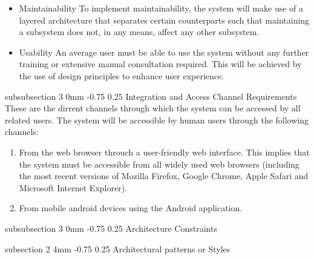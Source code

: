 \documentclass[12pt]{article}
\makeatletter
\renewcommand{\subsection}{\@startsection
   {subsection}%
   {2}%
   {4mm}%
   {-0.75\baselineskip}%
   {0.25\baselineskip}%
   {\rmfamily\normalfont\scshape\normalsize}}%
\renewcommand{\subsubsection}{\@startsection
   {subsubsection}%
   {3}%
   {0mm}%
   {-0.75\baselineskip}%
   {0.25\baselineskip}%
   {\rmfamily\normalfont\slshape\normalsize}}%
\makeatother
\begin{document}
\begin{itemize}
                							\item Maintainability
                									To implement maintainability, the system will make use of a layered architecture that separates certain counterparts such that maintaining a subsystem does not, in any means, affect any other subsystem.
		              								
                							\item Usability
                									An average user must be able to use the system without any further training or extensive manual consultation required. This will be achieved by the use of design principles to enhance user experience.
		               								
                							
                					\end{itemize} 
                			 
                			\subsubsection{Integration and Access Channel Requirements}
                					These are the dirrent channels through which the system can be accessed by all related users.
	                				The system will be accessible by human users through the following channels:
	                				
			                    	\begin{enumerate}
					                    	\item From the web browser throuch a user-friendly web interface. This implies that the system must be accessible from all widely used web browsers (including the most recent versions of Mozilla Firefox, Google Chrome, Apple Safari and Microsoft Internet Explorer).
					                    	\item From mobile android devices using the Android application.
			                    	\end{enumerate}  
			                    	  
                			\subsubsection{Architecture Constraints}
                			
                			  
                	\subsection{Architectural patterns or Styles}
\end{document}

